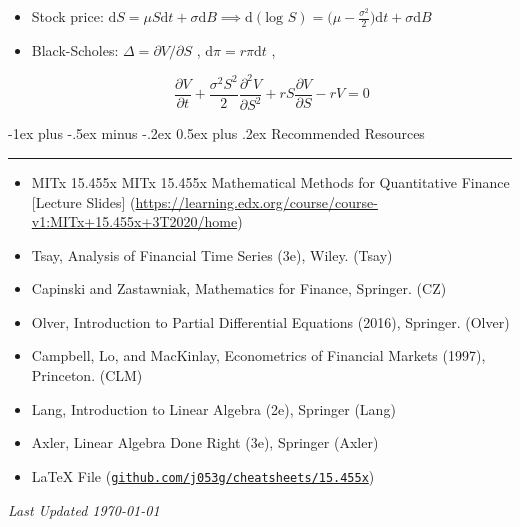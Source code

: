 \documentclass[10pt,landscape,a4paper]{article}
\makeatletter
\renewcommand{\section}{\@startsection{section}{1}{0mm}%
                                {-1ex plus -.5ex minus -.2ex}%
                                {0.5ex plus .2ex}%
                                {\normalfont\large\bfseries}}
\makeatother
\begin{document}
\begin{multicols*}{3}
\begin{description}[topsep=0pt]
\begin{itemize}[topsep=0pt]
      \item Stock price: $\text{d}S = \mu S \text{d}t + \sigma \text{d}B \implies \text{d}(\text{log } S) = \Big(\mu - \frac{\sigma^2}{2} \Big) \text{d}t + \sigma \text{d}B$
      \item Black-Scholes:  $\Delta = \partial V / \partial S$ , $\text{d}\pi=r \pi \text{d}t$  ,
   
      $$ \frac{\partial V}{\partial t} + \frac{\sigma^2 S^2}{2} \frac{\partial ^2 V}{\partial S^2} + r S \frac{\partial V}{\partial S} -rV =0 $$ 
	\end{itemize}
\end{description}



\newpage

\section{Recommended Resources} \smallskip \hrule height 1pt \smallskip

\bigskip

\begin{itemize}
\item MITx 15.455x 
MITx 15.455x
Mathematical Methods for Quantitative Finance [Lecture Slides] (\url{https://learning.edx.org/course/course-v1:MITx+15.455x+3T2020/home})

\item Tsay, Analysis of Financial Time Series (3e), Wiley. (Tsay)
\item Capinski and Zastawniak, Mathematics for Finance, Springer. (CZ)
\item Olver, Introduction to Partial Differential Equations (2016), Springer. (Olver)
\item Campbell, Lo, and MacKinlay, Econometrics of Financial Markets (1997), Princeton. (CLM)
\item Lang, Introduction to Linear Algebra (2e), Springer (Lang)
\item Axler, Linear Algebra Done Right (3e), Springer (Axler)
\item LaTeX File (\texttt{\href{https://github.com/j053g/cheatsheets/blob/main/15.455x_math_methods_for_quant_finance.tex}{github.com/j053g/cheatsheets/15.455x}})
\end{itemize}

\begin{center}
	\emph{Last Updated \today}
\end{center}

\end{multicols*}
\end{document}
